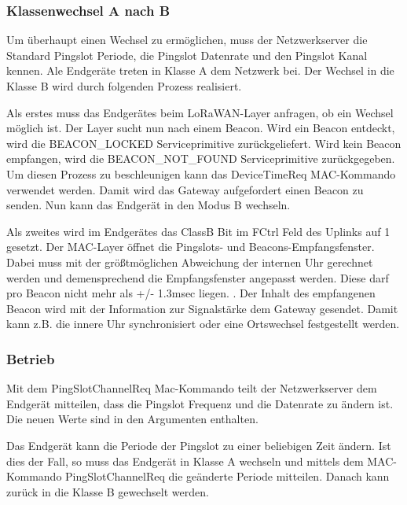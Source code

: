 \documentclass[a4paper, 12pt]{article}
\begin{document}
            \subsubsection{Klassenwechsel A nach B}
                Um überhaupt einen Wechsel zu ermöglichen, muss der Netzwerkserver die Standard Pingslot Periode, die 
                Pingslot Datenrate und den Pingslot Kanal kennen. Ale Endgeräte treten in Klasse A dem Netzwerk bei. 
                Der Wechsel in die Klasse B wird durch folgenden Prozess realisiert.

                Als erstes muss das Endgerätes beim LoRaWAN-Layer anfragen, ob ein Wechsel möglich ist. 
                Der Layer sucht nun nach einem Beacon. Wird ein Beacon entdeckt, wird die BEACON\_LOCKED 
                Serviceprimitive 
                zurückgeliefert. Wird kein Beacon empfangen, wird die BEACON\_NOT\_FOUND Serviceprimitive 
                zurückgegeben. Um diesen Prozess zu beschleunigen kann das DeviceTimeReq 
                MAC-Kommando verwendet werden. Damit wird das Gateway aufgefordert einen Beacon zu senden. Nun kann 
                das Endgerät in den Modus B wechseln.

                Als zweites wird im Endgerätes das ClassB Bit im FCtrl Feld des Uplinks auf 1 gesetzt. 
                Der MAC-Layer öffnet die Pingslots- und Beacons-Empfangsfenster. Dabei muss mit 
                der größtmöglichen Abweichung der internen Uhr gerechnet werden und demensprechend die 
                Empfangsfenster angepasst werden. Diese darf pro Beacon nicht mehr als +/- 1.3msec liegen. 
                \cite[S.73]{LoRaSpec}. Der Inhalt des empfangenen Beacon wird mit der Information zur 
                Signalstärke dem Gateway gesendet. Damit kann z.B. die innere Uhr synchronisiert 
                oder eine Ortswechsel festgestellt werden.
            \subsubsection{Betrieb}
                Mit dem PingSlotChannelReq Mac-Kommando teilt der Netzwerkserver dem Endgerät mitteilen, dass 
                die Pingslot Frequenz und die Datenrate zu ändern ist. Die neuen Werte sind in den 
                Argumenten enthalten.
                        
                Das Endgerät kann die Periode der Pingslot zu einer beliebigen Zeit ändern. Ist dies der Fall, so 
                muss das Endgerät in Klasse A wechseln und mittels dem MAC-Kommando PingSlotChannelReq die geänderte 
                Periode mitteilen. Danach kann zurück in die Klasse B gewechselt werden.
\end{document}
